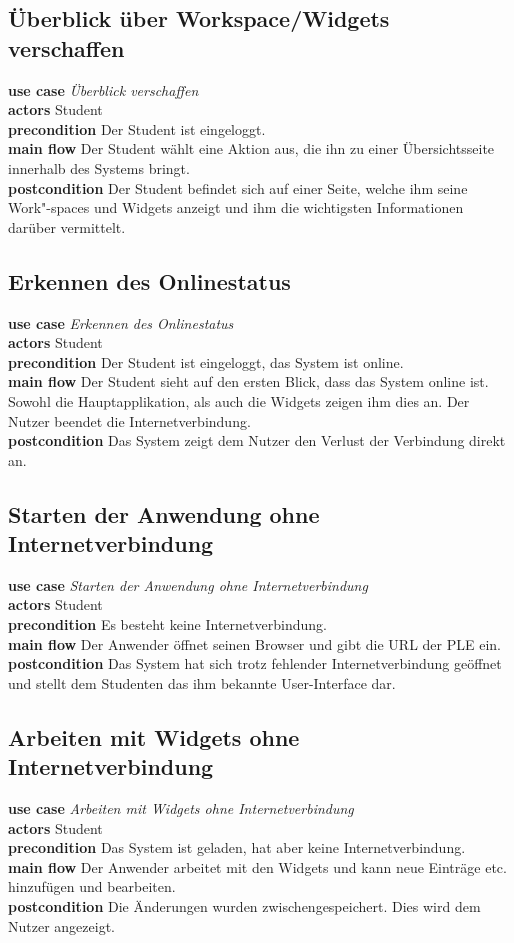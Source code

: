 \subsection{Überblick über Workspace/Widgets verschaffen}
\textbf{use case} \emph{Überblick verschaffen}\\
\textbf{actors} Student\\
\textbf{precondition} Der Student ist eingeloggt.\\
\textbf{main flow} Der Student wählt eine Aktion aus, die ihn zu einer Übersichtsseite innerhalb des Systems bringt.\\
\textbf{postcondition} Der Student befindet sich auf einer Seite, welche ihm seine Work"-spaces und Widgets anzeigt und ihm die wichtigsten Informationen darüber vermittelt.

\subsection{Erkennen des Onlinestatus}
\textbf{use case} \emph{Erkennen des Onlinestatus}\\
\textbf{actors} Student\\
\textbf{precondition} Der Student ist eingeloggt, das System ist online.\\
\textbf{main flow} Der Student sieht auf den ersten Blick, dass das System online ist. Sowohl die Hauptapplikation, als auch die Widgets zeigen ihm dies an. Der Nutzer beendet die Internetverbindung.\\
\textbf{postcondition} Das System zeigt dem Nutzer den Verlust der Verbindung direkt an.
 
\subsection{Starten der Anwendung ohne Internetverbindung}
\textbf{use case} \emph{Starten der Anwendung ohne Internetverbindung}\\
\textbf{actors} Student\\
\textbf{precondition} Es besteht keine Internetverbindung.\\
\textbf{main flow} Der Anwender öffnet seinen Browser und gibt die URL der PLE ein.\\
\textbf{postcondition} Das System hat sich trotz fehlender Internetverbindung geöffnet und stellt dem Studenten das ihm bekannte User-Interface dar.
 
\subsection{Arbeiten mit Widgets ohne Internetverbindung}
\textbf{use case} \emph{Arbeiten mit Widgets ohne Internetverbindung}\\
\textbf{actors} Student\\
\textbf{precondition} Das System ist geladen, hat aber keine Internetverbindung.\\
\textbf{main flow} Der Anwender arbeitet mit den Widgets und kann neue Einträge etc. hinzufügen und bearbeiten.\\
\textbf{postcondition} Die Änderungen wurden zwischengespeichert. Dies wird dem Nutzer angezeigt.


